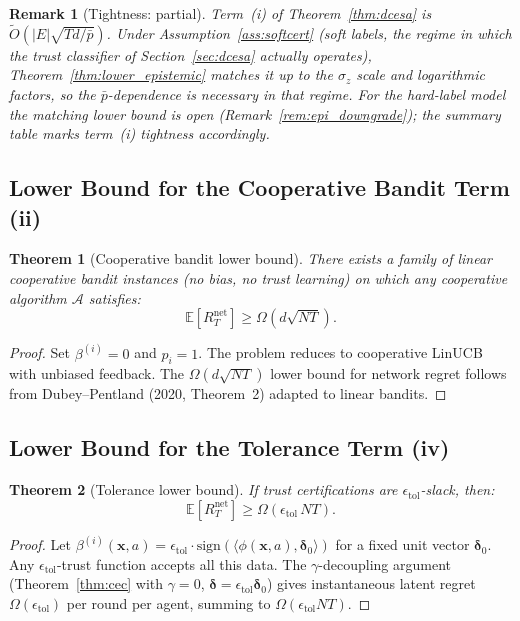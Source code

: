 \documentclass[11pt]{article}
\newtheorem{theorem}{Theorem}[section]
\newtheorem*{remark}{Remark}
\begin{document}
\begin{remark}[Tightness: partial]\label{rem:epi_tight}
Term~(i) of Theorem~\ref{thm:dcesa} is
$\widetilde{O}(|E|\sqrt{Td/\bar{p}})$.  Under
Assumption~\ref{ass:softcert} (soft labels, the regime in which the
trust \emph{classifier} of Section~\ref{sec:dcesa} actually operates),
Theorem~\ref{thm:lower_epistemic} matches it up to the $\sigma_z$ scale
and logarithmic factors, so the $\bar p$-dependence is necessary
\emph{in that regime}.  For the hard-label model the matching lower
bound is open (Remark~\ref{rem:epi_downgrade}); the summary table marks
term~(i) tightness accordingly.
\end{remark}

\subsection{Lower Bound for the Cooperative Bandit Term (ii)}

\begin{theorem}[Cooperative bandit lower bound]\label{thm:lower_coop}
There exists a family of linear cooperative bandit instances
(no bias, no trust learning) on which any cooperative algorithm
$\mathcal{A}$ satisfies:
\[
\mathbb{E}[R_T^{\mathrm{net}}]\geq\Omega(d\sqrt{NT}).
\]
\end{theorem}

\begin{proof}
Set $\beta^{(i)}=0$ and $p_i=1$.  The problem reduces to cooperative
LinUCB with unbiased feedback.  The $\Omega(d\sqrt{NT})$ lower bound
for network regret follows from Dubey--Pentland (2020, Theorem~2)
adapted to linear bandits.
\end{proof}

\subsection{Lower Bound for the Tolerance Term (iv)}

\begin{theorem}[Tolerance lower bound]\label{thm:lower_tol}
If trust certifications are $\epsilon_{\mathrm{tol}}$-slack, then:
\[
\mathbb{E}[R_T^{\mathrm{net}}]\geq\Omega(\epsilon_{\mathrm{tol}}\,NT).
\]
\end{theorem}

\begin{proof}
Let $\beta^{(i)}(\bm{x},a)=\epsilon_{\mathrm{tol}}
\cdot\mathrm{sign}(\langle\phi(\bm{x},a),\bm{\delta}_0\rangle)$
for a fixed unit vector $\bm{\delta}_0$.
Any $\epsilon_{\mathrm{tol}}$-trust function accepts all this data.
The $\gamma$-decoupling argument (Theorem~\ref{thm:cec} with
$\gamma=0$, $\bm{\delta}=\epsilon_{\mathrm{tol}}\bm{\delta}_0$)
gives instantaneous latent regret $\Omega(\epsilon_{\mathrm{tol}})$
per round per agent, summing to $\Omega(\epsilon_{\mathrm{tol}}NT)$.
\end{proof}
\end{document}
